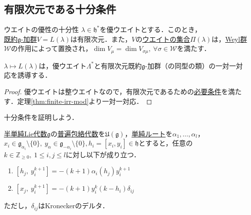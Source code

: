 \documentclass[rep_main]{subfiles}
\begin{document}
\subsection{有限次元である十分条件}
\begin{mytheo}[label=thm:suff-for-finite]{ウエイトの優性の十分性}
	$\lambda \in \mathfrak{h}^*$を優ウエイトとする．このとき，\\
	\hyperref[thm:hwmodule-exist]{既約$\mathfrak{g}$-加群}$V = L(\lambda)$は有限次元．また，$V$の\hyperref[def:weight-rep]{ウエイトの集合}$\Pi(\lambda)$は，\hyperref[def:Weylgroup]{Weyl群}$\mathscr{W}$の作用によって置換され，$\dim V_\mu = \dim V_{\sigma\mu},\ \forall \sigma \in \mathscr{W}$を満たす．
\end{mytheo}
\begin{mycol}[label=col:suff-for-finite]{}
	$\lambda \mapsto L(\lambda)$は，優ウエイト$\Lambda^*$と有限次元既約$\mathfrak{g}$-加群（の同型の類）の一対一対応を誘導する．
\end{mycol}
\begin{proof}
	優ウエイトは整ウエイトなので，有限次元であるための\hyperref[thm:necessary-for-finite]{必要条件}を満たす．定理\ref{thm:finite-irr-mod}より一対一対応．
\end{proof}
十分条件を証明しよう．
\begin{mylem}[label=lem:suff-for-finite]{}
	\hyperref[def:semisimple-LieAlg]{半単純Lie代数}$\mathfrak{g}$の\hyperref[def:univ-env-alg]{普遍包絡代数}を$\mathfrak{U}(\mathfrak{g})$，\hyperref[def:base-root]{単純ルート}を$\alpha_1, \ldots, \alpha_l$，$x_i \in \mathfrak{g}_{\alpha_i} \setminus \{0\},\ y_\alpha \in \mathfrak{g}_{-\alpha_i} \setminus \{0\}, h_i = [x_i, y_i] \in \mathfrak{h}$とすると，任意の$k \in \mathbb{Z}_{\geq 0},\ 1 \leq i, j \leq l$に対し以下が成り立つ．
	\begin{enumerate}
		\item $[h_j,\ y_i^{k+1}] = -(k+1)\alpha_i(h_j)y_i^{k+1}$
		\item $[x_j,\ y_i^{k+1}] = -(k+1)y_i^k(k - h_i)\delta_{ij}$
	\end{enumerate}
	ただし，$\delta_{ij}$はKroneckerのデルタ．
\end{mylem}
\end{document}
